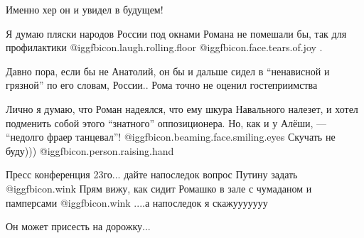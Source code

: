 \begin{itemize}
Именно хер он и увидел в будущем!

Я думаю пляски народов России под окнами Романа не помешали бы, так для профилактики  @igg{fbicon.laugh.rolling.floor}  @igg{fbicon.face.tears.of.joy} .

Давно пора, если бы не Анатолий, он бы и дальше сидел в \enquote{ненависной и грязной} по его словам, России.. Рома точно не оценил гостеприимства

Лично я думаю, что Роман надеялся, что ему шкура Навального налезет, и хотел подменить собой этого \enquote{знатного} оппозиционера.
Но, как и у Алёши, — \enquote{недолго фраер танцевал}!  @igg{fbicon.beaming.face.smiling.eyes} 
Скучать не буду)))  @igg{fbicon.person.raising.hand} 

Пресс конференция 23го... дайте напоследок вопрос Путину задать  @igg{fbicon.wink} 
Прям вижу, как сидит Ромашко в зале с чумаданом и памперсами  @igg{fbicon.wink} 
....а напоследок я скажууууууу

Он может присесть на дорожку...

\end{itemize} %
